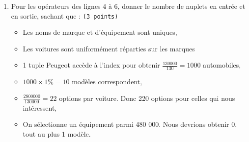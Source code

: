 \begin{enumerate}
    \item Pour les opérateurs des lignes 4 à 6, donner le nombre de nuplets en entrée et en sortie, sachant que : {\tt (3~points)}
\begin{itemize}
  \item Les noms de marque et d'équipement sont uniques,
  \item Les voitures sont uniformément réparties sur les marques
\end{itemize}
\begin{solution}
\begin{itemize}
  \item 1 tuple Peugeot accède à l'index pour obtenir $\frac{130 000}{130} =  1 000$ automobiles,
  \item $1000 \times 1\% = 10$ modèles correspondent,
  \item $\frac{2800000}{130000} = 22$ options par voiture. Donc 220 options pour celles qui nous intéressent,
  \item On sélectionne un équipement parmi 480 000. Nous devrions obtenir 0, tout au plus 1 modèle.
\end{itemize}
\end{solution}
\end{enumerate}
